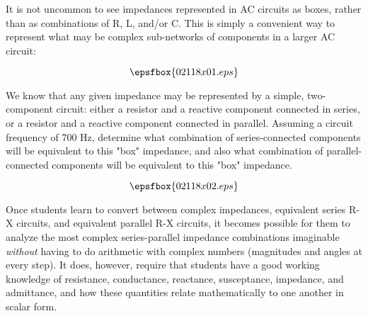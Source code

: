 

It is not uncommon to see impedances represented in AC circuits as boxes, rather than as combinations of R, L, and/or C.  This is simply a convenient way to represent what may be complex sub-networks of components in a larger AC circuit:

$$\epsfbox{02118x01.eps}$$

We know that any given impedance may be represented by a simple, two-component circuit: either a resistor and a reactive component connected in series, or a resistor and a reactive component connected in parallel.  Assuming a circuit frequency of 700 Hz, determine what combination of series-connected components will be equivalent to this "box" impedance, and also what combination of parallel-connected components will be equivalent to this "box" impedance.







$$\epsfbox{02118x02.eps}$$







Once students learn to convert between complex impedances, equivalent series R-X circuits, and equivalent parallel R-X circuits, it becomes possible for them to analyze the most complex series-parallel impedance combinations imaginable {\it without} having to do arithmetic with complex numbers (magnitudes and angles at every step).  It does, however, require that students have a good working knowledge of resistance, conductance, reactance, susceptance, impedance, and admittance, and how these quantities relate mathematically to one another in scalar form.




